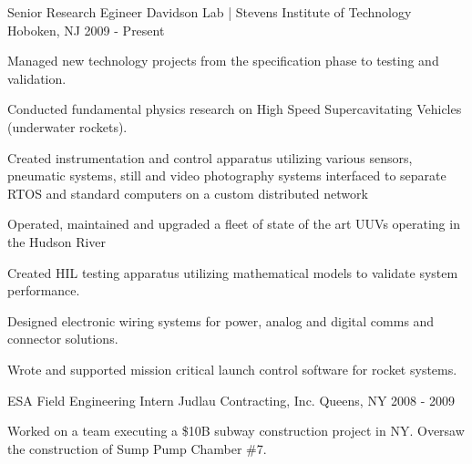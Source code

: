 

\begin{cventries}

  \cventry
    {Senior Research Egineer} %
    {Davidson Lab | Stevens Institute of Technology} %
    {Hoboken, NJ} %
    {2009 - Present} %
    {
      \begin{cvitems} %
        \item {Managed new technology projects from the specification phase to testing and validation.}
        \item {Conducted fundamental physics research on High Speed Supercavitating Vehicles (underwater rockets).}
        \item {Created instrumentation and control apparatus utilizing various sensors, pneumatic systems, still and video photography systems interfaced to separate RTOS and standard computers on a custom distributed network} 
        \item {Operated, maintained and upgraded a fleet of state of the art UUVs operating in the Hudson River}
        \item {Created HIL testing apparatus utilizing mathematical models to validate system performance.}
        \item {Designed electronic wiring systems for power, analog and digital comms and connector solutions.}
        \item {Wrote and supported mission critical launch control software for rocket systems.}
      \end{cvitems}
    }

  \cventry
    {ESA Field Engineering Intern} %
    {Judlau Contracting, Inc.} %
    {Queens, NY} %
    {2008 - 2009} %
    {%
      \begin{cvitems} %
        \item {Worked on a team executing a \$10B subway construction project in NY. Oversaw the construction of Sump Pump Chamber \#7.}
      \end{cvitems}
    }

\end{cventries}

